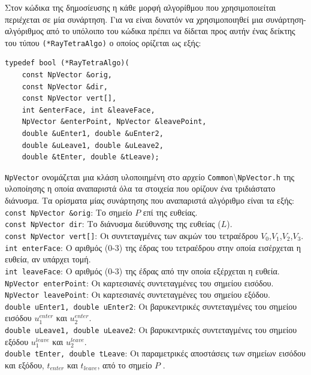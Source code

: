 Στον κώδικα της δημοσίευσης η κάθε μορφή αλγορίθμου που χρησιμοποιείται περιέχεται σε μία συνάρτηση. Για να είναι δυνατόν να χρησιμοποιηθεί μια συνάρτηση-αλγόριθμος από το υπόλοιπο του κώδικα πρέπει να δίδεται προς αυτήν ένας δείκτης του τύπου \verb!(*RayTetraAlgo)! ο οποίος ορίζεται ως εξής: 

\begin{verbatim}
typedef bool (*RayTetraAlgo)(
    const NpVector &orig, 
    const NpVector &dir,
    const NpVector vert[],
    int &enterFace, int &leaveFace,
    NpVector &enterPoint, NpVector &leavePoint,
    double &uEnter1, double &uEnter2, 
    double &uLeave1, double &uLeave2,
    double &tEnter, double &tLeave);
\end{verbatim}
\verb!NpVector! ονομάζεται μια κλάση υλοποιημένη στο αρχείο \verb!Common!\textbackslash \verb!NpVector.h! της υλοποίησης η οποία αναπαριστά όλα τα στοιχεία που ορίζουν ένα τριδιάστατο διάνυσμα. Τα ορίσματα μίας συνάρτησης που αναπαριστά αλγόριθμο είναι τα εξής:\\


\noindent \verb!const NpVector &orig!: Το σημείο $P$ επί της ευθείας.\\
\noindent \verb!const NpVector dir!: Το διάνυσμα διεύθυνσης της ευθείας ($L$).\\
\noindent \verb!const NpVector vert[]!: Οι συντεταγμένες των ακμών του τετραέδρου $V_0$,$V_1$,$V_2$,$V_3$.\\
\noindent \verb!int enterFace!: Ο αριθμός (0-3) της έδρας του τετραέδρου στην οποία εισέρχεται η ευθεία, αν υπάρχει τομή.\\
\noindent \verb!int leaveFace!: Ο αριθμός (0-3) της έδρας από την οποία εξέρχεται η ευθεία.\\
\noindent \verb!NpVector enterPoint!: Οι καρτεσιανές συντεταγμένες του σημείου εισόδου.\\
\noindent \verb!NpVector leavePoint!: Οι καρτεσιανές συντεταγμένες του σημείου εξόδου.\\
\noindent \verb!double uEnter1, double uEnter2!: Οι βαρυκεντρικές συντεταγμένες του σημείου εισόδου $u^{enter}_1$ και $u^{enter}_2$. \\
\noindent \verb!double uLeave1, double uLeave2!: Οι βαρυκεντρικές συντεταγμένες του σημείου εξόδου $u^{leave}_1$ και $u^{leave}_2$.\\
\noindent \verb!double tEnter, double tLeave!:  Οι παραμετρικές αποστάσεις των σημείων εισόδου και εξόδου, $t_{enter}$ και $t_{leave}$,  από το σημείο $P$ .\\

